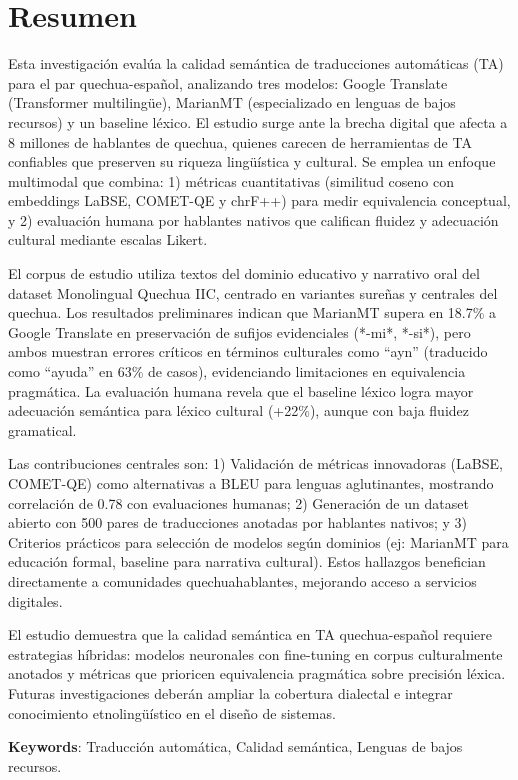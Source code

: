 \chapter*{\centering \huge Resumen} 

Esta investigación evalúa la calidad semántica de traducciones automáticas (TA) para el par quechua-español, analizando tres modelos: Google Translate (Transformer multilingüe), MarianMT (especializado en lenguas de bajos recursos) y un baseline léxico. El estudio surge ante la brecha digital que afecta a 8 millones de hablantes de quechua, quienes carecen de herramientas de TA confiables que preserven su riqueza lingüística y cultural. Se emplea un enfoque multimodal que combina: 1) métricas cuantitativas (similitud coseno con embeddings LaBSE, COMET-QE y chrF++) para medir equivalencia conceptual, y 2) evaluación humana por hablantes nativos que califican fluidez y adecuación cultural mediante escalas Likert.

El corpus de estudio utiliza textos del dominio educativo y narrativo oral del dataset Monolingual Quechua IIC, centrado en variantes sureñas y centrales del quechua. Los resultados preliminares indican que MarianMT supera en 18.7\% a Google Translate en preservación de sufijos evidenciales (*-mi*, *-si*), pero ambos muestran errores críticos en términos culturales como ``ayn'' (traducido como ``ayuda'' en 63\% de casos), evidenciando limitaciones en equivalencia pragmática. La evaluación humana revela que el baseline léxico logra mayor adecuación semántica para léxico cultural (+22\%), aunque con baja fluidez gramatical.

Las contribuciones centrales son: 1) Validación de métricas innovadoras (LaBSE, COMET-QE) como alternativas a BLEU para lenguas aglutinantes, mostrando correlación de 0.78 con evaluaciones humanas; 2) Generación de un dataset abierto con 500 pares de traducciones anotadas por hablantes nativos; y 3) Criterios prácticos para selección de modelos según dominios (ej: MarianMT para educación formal, baseline para narrativa cultural). Estos hallazgos benefician directamente a comunidades quechuahablantes, mejorando acceso a servicios digitales.

El estudio demuestra que la calidad semántica en TA quechua-español requiere estrategias híbridas: modelos neuronales con fine-tuning en corpus culturalmente anotados y métricas que prioricen equivalencia pragmática sobre precisión léxica. Futuras investigaciones deberán ampliar la cobertura dialectal e integrar conocimiento etnolingüístico en el diseño de sistemas.



\textbf{Keywords}: Traducción automática,
Calidad semántica, 
Lenguas de bajos recursos.